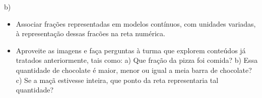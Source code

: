\begin{multicols}{2}
\begin{solucao}{}{}
\noindent b)

\noindent {}
\end{solucao}
\clearpage
\end{multicols}

\begin{objetivos}[label=chap3-ativ3]{}{}
\begin{itemize} %
    \item       Associar frações representadas em modelos contínuos, com unidades variadas, à representação dessas fracões na reta numérica.
\end{itemize} %
\end{objetivos}

\begin{orientacoes}{}{}
\begin{itemize} %
    \item       Aproveite as imagens e faça perguntas à turma que explorem conteúdos já tratados anteriormente, tais como: a) Que fração da pizza foi comida? b) Essa quantidade de chocolate é maior, menor ou igual a meia barra de chocolate? c) Se a maçã estivesse inteira, que ponto da reta representaria tal quantidade?
\end{itemize} %
\end{orientacoes}

